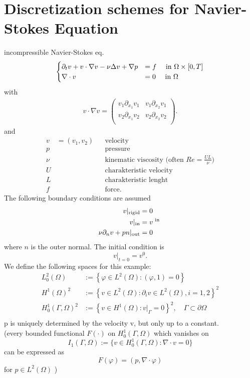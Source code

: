 \section{Discretization schemes for Navier-Stokes Equation}
incompressible Navier-Stokes eq.
\begin{align*}
	\begin{cases}
	\partial_t v + v \cdot \nabla v - \nu \Delta v + \nabla p &= f \quad \text{ in } \Omega \times [0,T]\\
	\nabla \cdot v &=0 \quad \text{ in } \Omega 
	\end{cases}
\end{align*}
with 
\begin{align*}
	v \cdot \nabla v  =
	\begin{pmatrix}
	v_1 \partial_{x_1}v_1& v_1\partial_{x_2}v_1\\
	v_2 \partial_{x_1}v_2& v_2\partial_{x_2}v_2\\
	\end{pmatrix}.
\end{align*}
and 
\begin{align*}
	v &= (v_1,v_2) && \text{velocity}\\
	p&&& \text{pressure}\\
	\nu &&& \text{kinematic viscosity (often } Re = \frac{UL}{\nu})\\
	U && &\text{charakteristic velocity}\\
	L && &\text{charakteristic lenght}\\
	f && &\text{force}.
\end{align*}
The following boundary conditions are assumed
\begin{align*}
	v|_{\text{rigid}} &= 0\\
	v|_{\text{in}} &= v^{\text{ in }}\\
	\nu \partial_nv+ pn|_{\text{out}} &=0\\
\end{align*}
where $n$ is the outer normal. The initial condition is
\begin{equation*}
	v|_{t=0}=v^0.
\end{equation*}
We define the following spaces for this example:
\begin{align*}
	L^2_0(\Omega) &:= \left \{ \varphi \in L^2(\Omega)\colon (\varphi,1)=0  \right\}\\
	H^1(\Omega)^2 &:= \left \{ v \in L^2(\Omega)\colon \partial_i v \in L^2(\Omega), i=1,2  \right\}^2\\
	H^1_0(\Gamma,\Omega)^2 &:= \left \{ v \in H^1(\Omega)\colon v|_\Gamma =0 \right\}^2, \quad \Gamma \subset \partial \Omega\\
\end{align*}
p is uniquely determined by the velocity v, but only up to a constant.\\
(every bounded functional $F(\cdot)$ on $H^1_0(\Gamma,\Omega)$ which vanishes on 
\begin{equation*}
	I_1(\Gamma,\Omega) := \{v \in H^1_0(\Gamma,\Omega)\colon \nabla\cdot v =0 \}
\end{equation*}
can be expressed as 
\begin{equation*}
	F(\varphi) = (p, \nabla \cdot \varphi)
\end{equation*}
for $p \in L^2(\Omega)$ )\\
